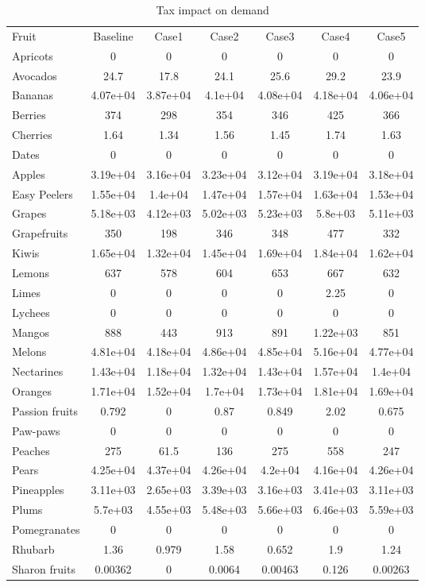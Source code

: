 \documentclass[11pt]{article}
\begin{document}
\begin{table}[h]
\caption{Tax impact on demand}
\label{table:tax impact 1}
\begin{center}
\begin{tabular}{lcccccc} \hline \hline
Fruit & Baseline & Case1 & Case2 & Case3 & Case4 & Case5 \\
Apricots &0 &0 &0 &0 &0 &0 \\
Avocados &24.7 &17.8 &24.1 &25.6 &29.2 &23.9 \\
Bananas &4.07e+04 &3.87e+04 &4.1e+04 &4.08e+04 &4.18e+04 &4.06e+04 \\
Berries &374 &298 &354 &346 &425 &366 \\
Cherries &1.64 &1.34 &1.56 &1.45 &1.74 &1.63 \\
\hline
Dates &0 &0 &0 &0 &0 &0 \\
Apples &3.19e+04 &3.16e+04 &3.23e+04 &3.12e+04 &3.19e+04 &3.18e+04 \\
Easy Peelers &1.55e+04 &1.4e+04 &1.47e+04 &1.57e+04 &1.63e+04 &1.53e+04 \\
Grapes &5.18e+03 &4.12e+03 &5.02e+03 &5.23e+03 &5.8e+03 &5.11e+03 \\
Grapefruits &350 &198 &346 &348 &477 &332 \\
\hline
Kiwis &1.65e+04 &1.32e+04 &1.45e+04 &1.69e+04 &1.84e+04 &1.62e+04 \\
Lemons &637 &578 &604 &653 &667 &632 \\
Limes &0 &0 &0 &0 &2.25 &0 \\
Lychees &0 &0 &0 &0 &0 &0 \\
Mangos &888 &443 &913 &891 &1.22e+03 &851 \\
\hline
Melons &4.81e+04 &4.18e+04 &4.86e+04 &4.85e+04 &5.16e+04 &4.77e+04 \\
Nectarines &1.43e+04 &1.18e+04 &1.32e+04 &1.43e+04 &1.57e+04 &1.4e+04 \\
Oranges &1.71e+04 &1.52e+04 &1.7e+04 &1.73e+04 &1.81e+04 &1.69e+04 \\
Passion fruits &0.792 &0 &0.87 &0.849 &2.02 &0.675 \\
Paw-paws &0 &0 &0 &0 &0 &0 \\
\hline
Peaches &275 &61.5 &136 &275 &558 &247 \\
Pears &4.25e+04 &4.37e+04 &4.26e+04 &4.2e+04 &4.16e+04 &4.26e+04 \\
Pineapples &3.11e+03 &2.65e+03 &3.39e+03 &3.16e+03 &3.41e+03 &3.11e+03 \\
Plums &5.7e+03 &4.55e+03 &5.48e+03 &5.66e+03 &6.46e+03 &5.59e+03 \\
Pomegranates &0 &0 &0 &0 &0 &0 \\
\hline
Rhubarb &1.36 &0.979 &1.58 &0.652 &1.9 &1.24 \\
Sharon fruits &0.00362 &0 &0.0064 &0.00463 &0.126 &0.00263 \\
 \hline \hline
\end{tabular}
\end{center}
\end{table}
\end{document}
